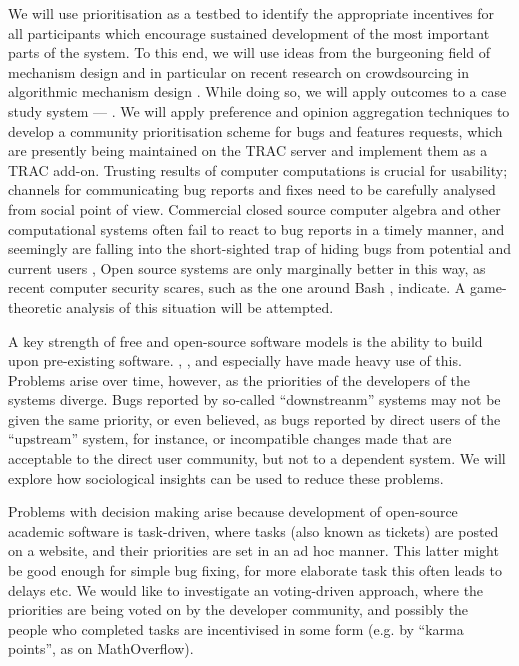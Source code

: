 \begin{workpackage}[id=social-aspects,wphases=0-48,
  title=Social Aspects,
  lead=UO,
  UORM=27,USHRM=8, USORM=6]
\begin{tasklist}
\begin{task}[title=Mechanism Design for free software development,id=decisionmaking]
We will use prioritisation as a testbed to identify the appropriate incentives for all
participants which encourage sustained development
of the most important parts of the system.
To this end, we will use
ideas from the burgeoning field of mechanism design \cite{AGTbook} and
in particular on recent research on crowdsourcing in algorithmic
mechanism design \cite{crowds}.  While doing so, we will apply
outcomes to a case study system --- \Sage.  We will apply preference
and opinion aggregation techniques \cite{pref-aggr} to develop a
community prioritisation scheme for \Sage bugs and features requests,
which are presently being maintained on the \Sage TRAC server
\cite{trac-sagemath} and implement them as a TRAC \cite{Trac} add-on.
 Trusting results of computer computations is crucial for
usability; channels for communicating bug reports and fixes need to be
carefully analysed from social point of view.  Commercial closed
source computer algebra and other computational systems often fail to
react to bug reports in a timely manner, and seemingly are falling
into the short-sighted trap of hiding bugs from potential and current
users \cite{misfort}, Open source systems are only marginally better
in this way, as recent computer security scares, such as the one
around Bash \cite{shellshock}, indicate.  A game-theoretic analysis of
this situation will be attempted.


A key strength of free and open-source software models is the ability
to build upon pre-existing software. \GAP, \PariGP, \Singular and
especially \Sage have made heavy use of this. Problems arise over
time, however, as the priorities of the developers of the systems
diverge. Bugs reported by so-called ``downstreanm'' systems may not be
given the same priority, or even believed, as bugs reported by direct
users of the ``upstream'' system, for instance, or incompatible
changes made that are acceptable to the direct user community, but not
to a dependent system. We will explore how sociological insights can
be used to reduce these problems.


Problems with decision making arise because 
development of open-source academic software is task-driven,
where tasks (also known as tickets) are posted on a website, and their
priorities are set in an ad hoc manner.  This latter might be
good enough for simple bug fixing, for more elaborate task this often
leads to delays etc.  We would like to investigate an voting-driven
approach, where the priorities are being voted on by the developer
community, and possibly the people who completed tasks are
incentivised in some form (e.g. by ``karma points'', as on
MathOverflow).


\end{task}
\end{tasklist}
\end{workpackage}
